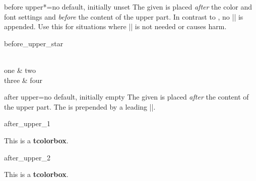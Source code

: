 \begin{docTcbKey}[][doc new=2019-02-26]{before upper*}{=}{no default, initially unset}
  The given  is placed \emph{after} the color and font settings
  and \emph{before} the content of the upper part.
  In contrast to , no |\ignorespaces| is appended.
  Use this for situations where |\ignorespaces| is not needed or causes harm.
\begin{exdispExample}{before_upper_star}
\begin{tcolorbox}[size=small,tile,
  colback=yellow!20,colbacktitle=yellow!70!black,
  title=My table,hbox,center,center title,
  before upper*=\begin{tabular}{cc},
  after upper*=\end{tabular},
]
  \\
  one & two \\
  three & four\\
\end{tcolorbox}
\end{exdispExample}
\end{docTcbKey}

\clearpage

\begin{docTcbKey}[][doc updated=2016-10-21]{after upper}{=}{no default, initially empty}
  The given  is placed \emph{after} the content of the upper part.
  The  is prepended by a leading |\unskip|.

\begin{exdispExample}{after_upper_1}

\begin{tcolorbox}[title=My title]
This is a \textbf{tcolorbox}.
\end{tcolorbox}
\end{exdispExample}

\begin{exdispExample}{after_upper_2}
\begin{tcolorbox}[before upper=\flqq,after upper=\frqq,
  colback=red!5!white,colframe=red!75!black]
This is a \textbf{tcolorbox}.
\end{tcolorbox}
\end{exdispExample}
\end{docTcbKey}


